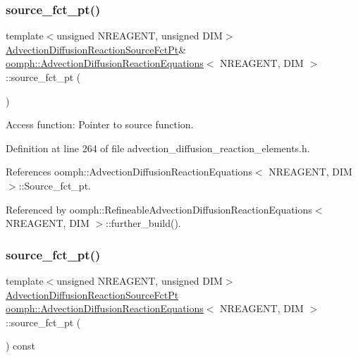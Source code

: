 \subsubsection{\texorpdfstring{source\+\_\+fct\+\_\+pt()}{source\_fct\_pt()}\hspace{0.1cm}{\footnotesize\ttfamily [1/2]}}
{\footnotesize\ttfamily template$<$unsigned N\+R\+E\+A\+G\+E\+NT, unsigned D\+IM$>$ \\
\hyperlink{classoomph_1_1AdvectionDiffusionReactionEquations_a3443e579e62414ecc50595403982e686}{Advection\+Diffusion\+Reaction\+Source\+Fct\+Pt}\& \hyperlink{classoomph_1_1AdvectionDiffusionReactionEquations}{oomph\+::\+Advection\+Diffusion\+Reaction\+Equations}$<$ N\+R\+E\+A\+G\+E\+NT, D\+IM $>$\+::source\+\_\+fct\+\_\+pt (\begin{DoxyParamCaption}{ }\end{DoxyParamCaption})\hspace{0.3cm}{\ttfamily [inline]}}



Access function\+: Pointer to source function. 



Definition at line 264 of file advection\+\_\+diffusion\+\_\+reaction\+\_\+elements.\+h.



References oomph\+::\+Advection\+Diffusion\+Reaction\+Equations$<$ N\+R\+E\+A\+G\+E\+N\+T, D\+I\+M $>$\+::\+Source\+\_\+fct\+\_\+pt.



Referenced by oomph\+::\+Refineable\+Advection\+Diffusion\+Reaction\+Equations$<$ N\+R\+E\+A\+G\+E\+N\+T, D\+I\+M $>$\+::further\+\_\+build().

\mbox{\label{classoomph_1_1AdvectionDiffusionReactionEquations_a6daf73f5f943bf4ec674b796fe4c36d2}} 
\subsubsection{\texorpdfstring{source\+\_\+fct\+\_\+pt()}{source\_fct\_pt()}\hspace{0.1cm}{\footnotesize\ttfamily [2/2]}}
{\footnotesize\ttfamily template$<$unsigned N\+R\+E\+A\+G\+E\+NT, unsigned D\+IM$>$ \\
\hyperlink{classoomph_1_1AdvectionDiffusionReactionEquations_a3443e579e62414ecc50595403982e686}{Advection\+Diffusion\+Reaction\+Source\+Fct\+Pt} \hyperlink{classoomph_1_1AdvectionDiffusionReactionEquations}{oomph\+::\+Advection\+Diffusion\+Reaction\+Equations}$<$ N\+R\+E\+A\+G\+E\+NT, D\+IM $>$\+::source\+\_\+fct\+\_\+pt (\begin{DoxyParamCaption}{ }\end{DoxyParamCaption}) const\hspace{0.3cm}{\ttfamily [inline]}}



